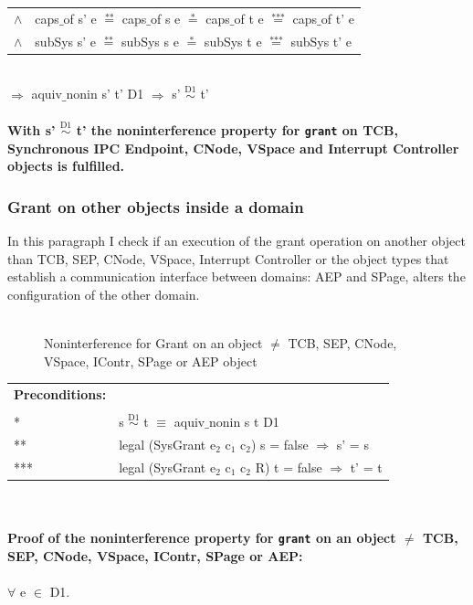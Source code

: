 \documentclass[11pt,a4paper,twoside]{article}
\begin{document}
{\begin{tabular}{ll}
$\wedge$ & caps$\_$of s' e $\overset{\text{**}}{=}$ caps$\_$of s e $\overset{\text{*}}{=}$ caps$\_$of t e $\overset{\text{***}}{=}$ caps$\_$of t' e \\
$\wedge$ & subSys s' e $\overset{\text{**}}{=}$ subSys s e $\overset{\text{*}}{=}$ subSys t e $\overset{\text{***}}{=}$ subSys t' e
\end{tabular} \\
$\Rightarrow$ aquiv$\_$nonin s' t' D1 $\Rightarrow$ s' $\overset{\text{D1}}{\sim}$ t' \\ \\
\textbf{With s' $\overset{\text{D1}}{\sim}$ t' the noninterference property for \texttt{grant} on TCB, Synchronous IPC Endpoint, CNode, VSpace and Interrupt Controller objects is fulfilled.} 
\clearpage
\subsubsection{Grant on other objects inside a domain} 
In this paragraph I check if an execution of the grant operation on another object than TCB, SEP, CNode, VSpace, Interrupt Controller or the object types that establish a communication interface between domains: AEP and SPage, alters the configuration of the other domain. \\ \\
\begin{flushleft}
\begin{figure}[H]
\caption{Noninterference for Grant on an object $\neq$ TCB, SEP, CNode, VSpace, IContr, SPage or AEP object}
\end{figure}
\end{flushleft}
\begin{tabular}{ll}
\textbf{Preconditions:} \\ \\
* & s $\overset{\text{D1}}{\sim}$ t $\equiv$ aquiv$\_$nonin s t D1	\\ 
** & legal (SysGrant e$_2$ c$_1$ c$_2$) s = false $\Rightarrow$ s' = s \\ 
*** & legal (SysGrant e$_2$ c$_1$ c$_2$ R) t = false $\Rightarrow$ t' = t
\end{tabular}\\ \\ 
\textbf{Proof of the noninterference property for \texttt{grant} on an object $\neq$ TCB, SEP, CNode, VSpace, IContr, SPage or AEP:}\\ \\
$\forall$ e $\in$ D1. \\ 
}
\end{document}
